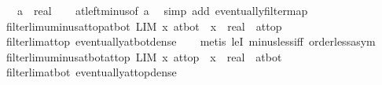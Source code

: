 \begin{isabellebody}
\ \ \ a\ {\isacharcolon}{\kern0pt}{\isacharcolon}{\kern0pt}\ real\isanewline
%
\isadelimproof
\ \ %
\endisadelimproof
%
\isatagproof
{}\isamarkupfalse%
\ at{\isacharunderscore}{\kern0pt}left{\isacharunderscore}{\kern0pt}minus{\isacharbrackleft}{\kern0pt}of\ a{\isacharbrackright}{\kern0pt}\ \isamarkupfalse%
\ {\isacharparenleft}{\kern0pt}simp\ add{\isacharcolon}{\kern0pt}\ eventually{\isacharunderscore}{\kern0pt}filtermap{\isacharparenright}{\kern0pt}%
\endisatagproof
{\isafoldproof}%
%
\isadelimproof
\isanewline
%
\endisadelimproof
\isanewline
{}\isamarkupfalse%
\ filterlim{\isacharunderscore}{\kern0pt}uminus{\isacharunderscore}{\kern0pt}at{\isacharunderscore}{\kern0pt}top{\isacharunderscore}{\kern0pt}at{\isacharunderscore}{\kern0pt}bot{\isacharcolon}{\kern0pt}\ {\isachardoublequoteopen}LIM\ x\ at{\isacharunderscore}{\kern0pt}bot{\isachardot}{\kern0pt}\ {\isacharminus}{\kern0pt}\ x\ {\isacharcolon}{\kern0pt}{\isacharcolon}{\kern0pt}\ real\ {\isacharcolon}{\kern0pt}{\isachargreater}{\kern0pt}\ at{\isacharunderscore}{\kern0pt}top{\isachardoublequoteclose}\isanewline
%
\isadelimproof
\ \ %
\endisadelimproof
%
\isatagproof
{}\isamarkupfalse%
\ filterlim{\isacharunderscore}{\kern0pt}at{\isacharunderscore}{\kern0pt}top\ eventually{\isacharunderscore}{\kern0pt}at{\isacharunderscore}{\kern0pt}bot{\isacharunderscore}{\kern0pt}dense\isanewline
\ \ \isamarkupfalse%
\ {\isacharparenleft}{\kern0pt}metis\ leI\ minus{\isacharunderscore}{\kern0pt}less{\isacharunderscore}{\kern0pt}iff\ order{\isacharunderscore}{\kern0pt}less{\isacharunderscore}{\kern0pt}asym{\isacharparenright}{\kern0pt}%
\endisatagproof
{\isafoldproof}%
%
\isadelimproof
\isanewline
%
\endisadelimproof
\isanewline
{}\isamarkupfalse%
\ filterlim{\isacharunderscore}{\kern0pt}uminus{\isacharunderscore}{\kern0pt}at{\isacharunderscore}{\kern0pt}bot{\isacharunderscore}{\kern0pt}at{\isacharunderscore}{\kern0pt}top{\isacharcolon}{\kern0pt}\ {\isachardoublequoteopen}LIM\ x\ at{\isacharunderscore}{\kern0pt}top{\isachardot}{\kern0pt}\ {\isacharminus}{\kern0pt}\ x\ {\isacharcolon}{\kern0pt}{\isacharcolon}{\kern0pt}\ real\ {\isacharcolon}{\kern0pt}{\isachargreater}{\kern0pt}\ at{\isacharunderscore}{\kern0pt}bot{\isachardoublequoteclose}\isanewline
%
\isadelimproof
\ \ %
\endisadelimproof
%
\isatagproof
{}\isamarkupfalse%
\ filterlim{\isacharunderscore}{\kern0pt}at{\isacharunderscore}{\kern0pt}bot\ eventually{\isacharunderscore}{\kern0pt}at{\isacharunderscore}{\kern0pt}top{\isacharunderscore}{\kern0pt}dense\isanewline

\end{isabellebody}
